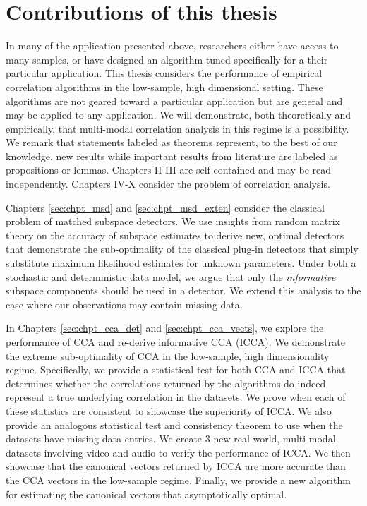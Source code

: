 \section{Contributions of this thesis}

In many of the application presented above, researchers either have access to many
samples, or have designed an algorithm tuned specifically for a their particular
application. This thesis considers the performance of empirical correlation algorithms in
the low-sample, high dimensional setting. These algorithms are not geared toward a
particular application but are general and may be applied to any application. We will
demonstrate, both theoretically and empirically, that multi-modal correlation analysis in
this regime is a possibility. We remark that statements labeled as theorems represent, to
the best of our knowledge, new results while important results from literature are labeled
as propositions or lemmas. Chapters II-III are self contained and may be read
independently. Chapters IV-X consider the problem of correlation analysis.

Chapters \ref{sec:chpt_msd} and \ref{sec:chpt_msd_exten} consider the classical problem of
matched subspace detectors. We use insights from random matrix theory on the accuracy of
subspace estimates to derive new, optimal detectors that demonstrate the sub-optimality of
the classical plug-in detectors that simply substitute maximum likelihood estimates for
unknown parameters. Under both a stochastic and deterministic data model, we argue that
only the \textit{informative} subspace components should be used in a detector. We extend
this analysis to the case where our observations may contain missing data.

In Chapters \ref{sec:chpt_cca_det} and \ref{sec:chpt_cca_vects}, we explore the
performance of CCA and re-derive informative CCA (ICCA). We demonstrate the extreme
sub-optimality of CCA in the low-sample, high dimensionality regime. Specifically, we
provide a statistical test for both CCA and ICCA that determines whether the correlations
returned by the algorithms do indeed represent a true underlying correlation in the
datasets. We prove when each of these statistics are consistent to showcase the
superiority of ICCA. We also provide an analogous statistical test and consistency theorem
to use when the datasets have missing data entries. We create 3 new real-world,
multi-modal datasets involving video and audio to verify the performance of ICCA. We then
showcase that the canonical vectors returned by ICCA are more accurate than the CCA
vectors in the low-sample regime. Finally, we provide a new algorithm for estimating the
canonical vectors that asymptotically optimal.

